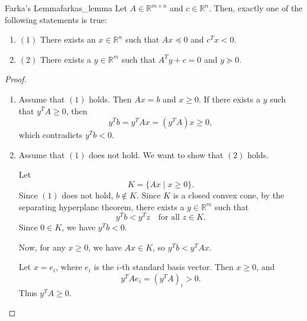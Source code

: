 \begin{lemma}{Farka's Lemma}{farkas_lemma}
  Let \(A \in \mathbb{R}^{m \times n}\) and \(c \in \mathbb{R}^n\). Then, exactly one of the following statements is true:
  \begin{enumerate}
    \item[] \((1)\) There exists an \(x \in \mathbb{R}^n\) such that \(Ax \preceq 0\) and \(c^T x < 0\).
    \item[] \((2)\) There exists a \(y \in \mathbb{R}^m\) such that \(A^T y + c = 0\) and \(y \succeq 0\).
  \end{enumerate}
\end{lemma}

\begin{proof}
  \begin{enumerate}
    \item[] Assume that \((1)\) holds. Then \(Ax = b\) and \(x \ge 0\). If there exists a \(y\) such that \(y^T A \ge 0\), then
          \[
            y^T b = y^T Ax = (y^T A)x \ge 0,
          \]
          which contradicts \(y^T b < 0\).
    \item[] Assume that \((1)\) does not hold. We want to show that \((2)\) holds.

          Let
          \[
            K = \{Ax \mid x \ge 0\}.
          \]
          Since \((1)\) does not hold, \(b \notin K\). Since \(K\) is a closed convex cone, by the separating hyperplane theorem, there exists a \(y \in \mathbb{R}^m\) such that
          \[
            y^T b < y^T z \quad \text{for all } z \in K.
          \]
          Since \(0 \in K\), we have \(y^T b < 0\).

          Now, for any \(x \ge 0\), we have \(Ax \in K\), so \(y^T b < y^T Ax\).

          Let \(x = e_i\), where \(e_i\) is the \(i\)-th standard basis vector. Then \(x \ge 0\), and
          \[
            y^T A e_i = (y^T A)_i > 0.
          \]
          Thus \(y^T A \ge 0\).
  \end{enumerate}

  \begin{center}
\end{center}
\end{proof}
